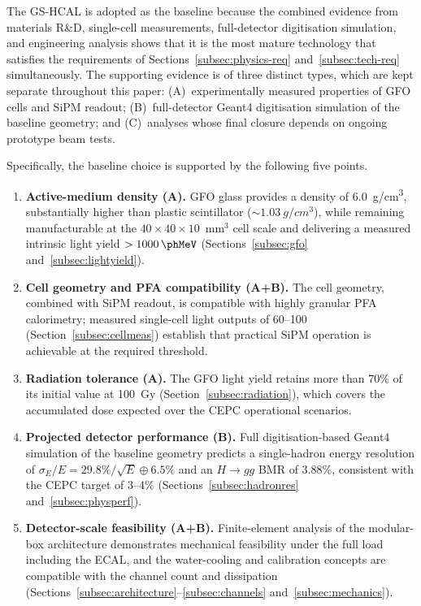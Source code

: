 The GS-HCAL is adopted as the baseline because the combined evidence
from materials R\&D, single-cell measurements, full-detector
digitisation simulation, and engineering analysis shows that it is the
most mature technology that satisfies the requirements of
Sections~\ref{subsec:physics-req} and~\ref{subsec:tech-req}
simultaneously.
The supporting evidence is of three distinct types, which are kept
separate throughout this paper:
(A)~experimentally measured properties of GFO cells and SiPM readout;
(B)~full-detector Geant4 digitisation simulation of the baseline
geometry; and (C)~analyses whose final closure depends on ongoing
prototype beam tests.

Specifically, the baseline choice is supported by the following five
points.

\begin{enumerate}
\item \textbf{Active-medium density (A).}
  GFO glass provides a density of \SI{6.0}{g/cm^{3}}, substantially
  higher than plastic scintillator (${\sim}\SI{1.03}{g/cm^{3}}$),
  while remaining manufacturable at the $40\times40\times10$~mm$^{3}$
  cell scale and delivering a measured intrinsic light yield
  $>\SI{1000}{\phMeV}$ (Sections~\ref{subsec:gfo}
  and~\ref{subsec:lightyield}).
\item \textbf{Cell geometry and PFA compatibility (A+B).}
  The \cellsize cell geometry, combined with \sipmsize SiPM readout,
  is compatible with highly granular PFA calorimetry; measured
  single-cell light outputs of 60--100~\peMIP
  (Section~\ref{subsec:cellmeas}) establish that practical SiPM
  operation is achievable at the required threshold.
\item \textbf{Radiation tolerance (A).}
  The GFO light yield retains more than 70\% of its initial value at
  \SI{100}{Gy} (Section~\ref{subsec:radiation}), which covers the
  accumulated dose expected over the CEPC operational scenarios.
\item \textbf{Projected detector performance (B).}
  Full digitisation-based Geant4 simulation of the baseline geometry
  predicts a single-hadron energy resolution of
  $\sigma_{E}/E = 29.8\%/\sqrt{E}\oplus6.5\%$ and an $H\to gg$ BMR of
  3.88\%, consistent with the CEPC target of 3--4\%
  (Sections~\ref{subsec:hadronres} and~\ref{subsec:physperf}).
\item \textbf{Detector-scale feasibility (A+B).}
  Finite-element analysis of the modular-box architecture demonstrates
  mechanical feasibility under the full load including the ECAL, and
  the water-cooling and calibration concepts are compatible with the
  channel count and dissipation
  (Sections~\ref{subsec:architecture}--\ref{subsec:channels}
  and~\ref{subsec:mechanics}).
\end{enumerate}

